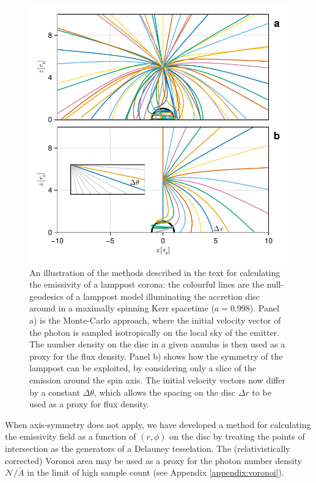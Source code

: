\documentclass[fleqn,usenatbib]{mnras}
\begin{document}
\begin{figure}
    \centering
    \includegraphics[width=0.95\linewidth]{figures/emissivity.coronal-traces.pdf}
    \caption{An illustration of the methods described in the text for
        calculating the emissivity of a lamppost corona: the colourful lines are
        the null-geodesics of a lamppost model illuminating the accretion disc
        around in a maximally spinning Kerr spacetime ($a = 0.998$). Panel a) is
        the Monte-Carlo approach, where the initial velocity vector of the
        photon is sampled isotropically on the local sky of the emitter. The
        number density on the disc in a given annulus is then used as a proxy
        for the flux density. Panel b) shows how the symmetry of the lamppost can
        be exploited, by considering only a slice of the emission around the
        spin axis. The initial velocity vectors now differ by a constant $\Delta
    \theta$, which allows the spacing on the disc $\Delta r$ to be used as a
proxy for flux density.}
    \label{fig:coronal-tracing}
\end{figure}

When axis-symmetry does not apply, we have developed a method for calculating
the emissivity field as a function of $(r, \phi)$ on the disc by treating the
points of intersection as the generators of a Delauney tesselation. The
(relativistically corrected) Voronoi area may be used as a proxy for the photon
number density $\mathcal{N} /\tilde{A}$  in the limit of high sample count (see
Appendix \ref{appendix:voronoi}).
\end{document}
